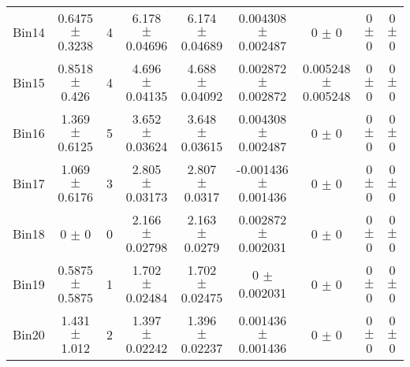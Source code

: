 \begin{tabular}{@{\extracolsep{4pt}}lcccccccc@{}}
     Bin14 & 0.6475 $\pm$ 0.3238 & 4 & 6.178 $\pm$ 0.04696 & 6.174 $\pm$ 0.04689 & 0.004308 $\pm$ 0.002487 & 0 $\pm$ 0 & 0 $\pm$ 0 & 0 $\pm$ 0 \\ 
     Bin15 & 0.8518 $\pm$ 0.426 & 4 & 4.696 $\pm$ 0.04135 & 4.688 $\pm$ 0.04092 & 0.002872 $\pm$ 0.002872 & 0.005248 $\pm$ 0.005248 & 0 $\pm$ 0 & 0 $\pm$ 0 \\ 
     Bin16 & 1.369 $\pm$ 0.6125 & 5 & 3.652 $\pm$ 0.03624 & 3.648 $\pm$ 0.03615 & 0.004308 $\pm$ 0.002487 & 0 $\pm$ 0 & 0 $\pm$ 0 & 0 $\pm$ 0 \\ 
     Bin17 & 1.069 $\pm$ 0.6176 & 3 & 2.805 $\pm$ 0.03173 & 2.807 $\pm$ 0.0317 & -0.001436 $\pm$ 0.001436 & 0 $\pm$ 0 & 0 $\pm$ 0 & 0 $\pm$ 0 \\ 
     Bin18 & 0 $\pm$ 0 & 0 & 2.166 $\pm$ 0.02798 & 2.163 $\pm$ 0.0279 & 0.002872 $\pm$ 0.002031 & 0 $\pm$ 0 & 0 $\pm$ 0 & 0 $\pm$ 0 \\ 
     Bin19 & 0.5875 $\pm$ 0.5875 & 1 & 1.702 $\pm$ 0.02484 & 1.702 $\pm$ 0.02475 & 0 $\pm$ 0.002031 & 0 $\pm$ 0 & 0 $\pm$ 0 & 0 $\pm$ 0 \\ 
     Bin20 & 1.431 $\pm$ 1.012 & 2 & 1.397 $\pm$ 0.02242 & 1.396 $\pm$ 0.02237 & 0.001436 $\pm$ 0.001436 & 0 $\pm$ 0 & 0 $\pm$ 0 & 0 $\pm$ 0 \\ 
\hline\hline
  \end{tabular}
